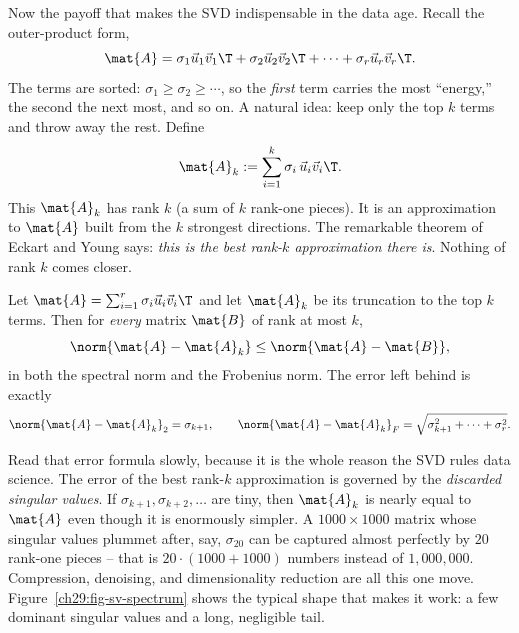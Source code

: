 Now the payoff that makes the SVD indispensable in the data age. Recall the
outer-product form,
\[
  \mat{A} = \sigma_1 \vec{u}_1\vec{v}_1\T + \sigma_2 \vec{u}_2\vec{v}_2\T
            + \cdots + \sigma_r \vec{u}_r\vec{v}_r\T.
\]
The terms are sorted: $\sigma_1 \ge \sigma_2 \ge \cdots$, so the \emph{first}
term carries the most ``energy,'' the second the next most, and so on. A natural
idea: keep only the top $k$ terms and throw away the rest. Define
\[
  \mat{A}_k := \sum_{i=1}^{k} \sigma_i\,\vec{u}_i\vec{v}_i\T.
\]
This $\mat{A}_k$ has rank $k$ (a sum of $k$ rank-one pieces). It is an
approximation to $\mat{A}$ built from the $k$ strongest directions. The
remarkable theorem of Eckart and Young says: \emph{this is the best rank-$k$
approximation there is}. Nothing of rank $k$ comes closer.

\begin{formalbox}
\begin{theorem}
\label{ch29:thm-eckart-young}
Let $\mat{A} = \sum_{i=1}^r \sigma_i \vec{u}_i\vec{v}_i\T$ and let $\mat{A}_k$ be
its truncation to the top $k$ terms. Then for \emph{every} matrix $\mat{B}$ of
rank at most $k$,
\[
  \norm{\mat{A} - \mat{A}_k} \le \norm{\mat{A} - \mat{B}},
\]
in both the spectral norm and the Frobenius norm. The error left behind is
exactly
\[
  \norm{\mat{A} - \mat{A}_k}_{2} = \sigma_{k+1}, \qquad
  \norm{\mat{A} - \mat{A}_k}_{F} = \sqrt{\sigma_{k+1}^2 + \cdots + \sigma_r^2}.
\]
\end{theorem}
\end{formalbox}

Read that error formula slowly, because it is the whole reason the SVD rules data
science. The error of the best rank-$k$ approximation is governed by the
\emph{discarded singular values}. If $\sigma_{k+1}, \sigma_{k+2}, \dots$ are tiny,
then $\mat{A}_k$ is nearly equal to $\mat{A}$ even though it is enormously
simpler. A $1000\times 1000$ matrix whose singular values plummet after, say,
$\sigma_{20}$ can be captured almost perfectly by $20$ rank-one pieces -- that is
$20\cdot(1000 + 1000)$ numbers instead of $1{,}000{,}000$. Compression, denoising,
and dimensionality reduction are all this one move.
Figure~\ref{ch29:fig-sv-spectrum} shows the typical shape that makes it work: a
few dominant singular values and a long, negligible tail.

